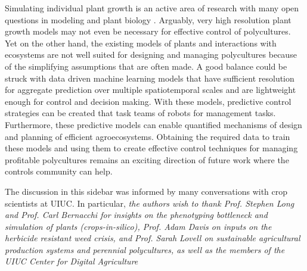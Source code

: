 \documentclass[letterpaper,12pt,peerreviewca,draftcls]{IEEEtran}
\begin{document}
Simulating individual plant growth is an active area of research with many open questions in modeling and plant biology \cite{zhu2016plants}. Arguably, very high resolution plant growth models may not even be necessary for effective control of polycultures. Yet on the other hand, the  %
 existing models of plants and interactions with ecosystems \cite{Stehfest2007a,Foley1996a, Kucharik2003a,Friedl2010a, Rodrigues2010a, Nunes2013a} are not well suited for designing and managing polycultures because of the simplifying assumptions that are often made. A good balance could be struck with data driven machine learning models that have sufficient resolution for aggregate prediction over multiple spatiotemporal scales and are lightweight enough for control and decision making. With these models, predictive control strategies can be created that task teams of robots for management tasks. Furthermore, these predictive models can enable quantified mechanisms of design and planning of efficient agroecosystems.  
 Obtaining the required data to train these models and using them to create effective control techniques for managing profitable polycultures remains an exciting direction of future work where the controls community can help.
 
 The discussion in this sidebar was informed by many conversations with  crop scientists at UIUC. In particular, 
\textit{the authors wish to thank Prof. Stephen Long and Prof. Carl Bernacchi for insights on the phenotyping bottleneck and simulation of plants (\textit{crops-in-silico}), Prof. Adam Davis on inputs on the herbicide resistant weed crisis, and Prof. Sarah Lovell on sustainable agricultural production systems and perennial polycultures, as well as the members of the UIUC Center for Digital Agriculture} 
\end{document}

